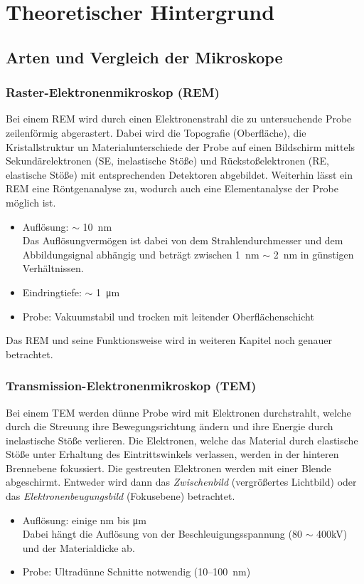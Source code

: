 
\chapter{Theoretischer Hintergrund}
\label{chap:fvz}

\section{Arten und Vergleich der Mikroskope}
\label{sec:artenEM}

\subsection*{Raster-Elektronenmikroskop (REM)}
Bei einem REM wird durch einen Elektronenstrahl die zu untersuchende Probe zeilenförmig abgerastert. Dabei wird die Topografie (Oberfläche), die Kristallstruktur un Materialunterschiede der Probe auf einen Bildschirm mittels Sekundärelektronen (SE, inelastische Stöße) und Rückstoßelektronen (RE, elastische Stöße) mit entsprechenden Detektoren abgebildet. Weiterhin lässt ein REM eine Röntgenanalyse zu, wodurch auch eine Elementanalyse der Probe möglich ist. \citep{RasterEM}
\begin{itemize}
    \item Auflösung: $\sim$ \SI{10}{\nano\metre}\\
    Das Auflösungvermögen ist dabei von dem Strahlendurchmesser und dem Abbildungsignal abhängig und beträgt zwischen \SI{1}{\nano\metre} $\sim$ \SI{2}{\nano\metre} in günstigen Verhältnissen. \citep{WikiREM}
    \item Eindringtiefe: $\sim$ \SI{1}{\micro\metre}
    \item Probe: Vakuumstabil und trocken mit leitender Oberflächenschicht 
\end{itemize}
Das REM und seine Funktionsweise wird in weiteren Kapitel noch genauer betrachtet.

\subsection*{Transmission-Elektronenmikroskop (TEM)}
Bei einem TEM werden dünne Probe wird mit Elektronen durchstrahlt, welche durch die Streuung ihre Bewegungsrichtung ändern und ihre Energie durch inelastische Stöße verlieren. Die Elektronen, welche das Material durch elastische Stöße unter Erhaltung des Eintrittswinkels verlassen, werden in der hinteren Brennebene fokussiert. Die gestreuten Elektronen werden mit einer Blende abgeschirmt. Entweder wird dann das \textit{Zwischenbild} (vergrößertes Lichtbild) oder das \textit{Elektronenbeugungsbild} (Fokusebene) betrachtet. 
\begin{itemize}
    \item Auflösung: einige \si{\nano\metre} bis \si{\micro\metre}\\
    Dabei hängt die Auflösung von der Beschleuigungsspannung (80 $\sim$ 400\si{\kilo\volt}) und der Materialdicke ab. 
    \item Probe: Ultradünne Schnitte notwendig (10–\SI{100}{\nano\metre}) \citep{WikiTEM}
\end{itemize}
\newpage

